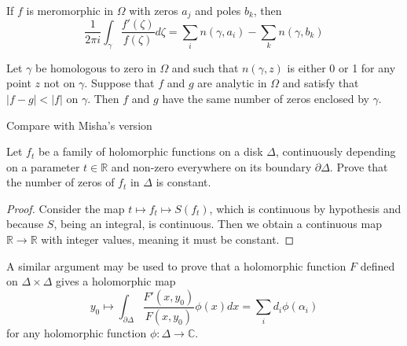\begin{theorem}
\label{theorem-argum-princ-rouch-theor}
\begin{reference}
\cite[Chapter 5, Theorem 18]{ahl}
\end{reference}
If $f$ is meromorphic in $\Omega$ with zeros
$a_j$ and poles $b_k$, then
\begin{equation}
\label{equation-argument-principle}
\frac{1}{2\pi
i}\int_\gamma\frac{f'(\zeta)}{f(\zeta)}d\zeta
=\sum_{i}n(\gamma,a_i)-\sum_{k}n(\gamma,b_k)
\end{equation}
\end{theorem}

\begin{lemma}
\label{lemma-Rouche-theorem}
\begin{reference}
\cite[Chapter 5, Corollary, p. 153]{ahl}
\end{reference}
Let $\gamma$ be homologous to zero in
$\Omega$ and such that $n(\gamma,z)$ is
either 0 or 1 for any point $z$ not on
$\gamma$. Suppose that $f$ and $g$ are
analytic in $\Omega$ and satisfy that
$|f-g|<|f|$ on $\gamma$. Then $f$ and $g$
have the same number of zeros enclosed by
$\gamma$.
\end{lemma}

Compare with Misha's version

\begin{theorem}
\label{theorem-Rouche-theorem-Mishas-version}
Let $f_t$ be a family of holomorphic
functions on a disk  $\Delta$, continuously
depending on a parameter $t\in \mathbb{R}$
and non-zero everywhere on its
boundary $\partial\Delta$. Prove that the
number of zeros of $f_t$ in $\Delta$
is constant.
\end{theorem}

\begin{proof}
Consider the map $t\mapsto f_t\mapsto
S(f_t)$, which is continuous by hypothesis
and because $S$, being an integral, is
continuous. Then we obtain a continuous
map $\mathbb{R}\to\mathbb{R}$ with integer
values, meaning it must be constant.
\end{proof}

A similar argument may be used to prove that
a holomorphic function $F$ defined
on $\Delta\times\Delta$ gives a holomorphic
map
\begin{equation}
\label{equation-zeros-on-polydisk}
y_0\mapsto
\int_{\partial\Delta}\frac{F'(x,y_0)}{F(x,
y_0)}\phi(x)dx
=\sum_id_i\phi(\alpha_i)
\end{equation}
for any holomorphic function
$\phi:\Delta\to\mathbb{C}$.

